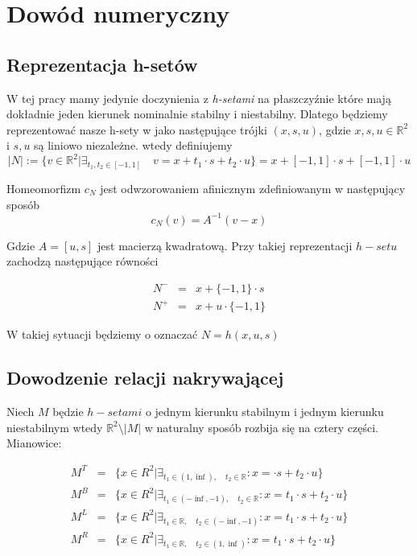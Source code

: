 
\section{Dowód numeryczny}

\subsection{Reprezentacja h-setów}

W tej pracy mamy jedynie doczynienia z {\em h-setami} na płaszczyźnie które mają dokładnie jeden kierunek 
nominalnie stabilny i niestabilny. Dlatego będziemy reprezentować nasze h-sety  w jako następujące trójki 
$ (x,s,u) $, gdzie $x,s,u \in \mathbb R^2 $ i $s,u$ są liniowo niezależne. wtedy definiujemy 
$$
  |N| := \{v \in \mathbb R^2 | \exists_{t_1,t_2 \in [-1,1]} \quad v = x + t_1 \cdot s + t_2 \cdot u  \}
      = x + [-1,1]\cdot s + [-1,1]\cdot u 
$$

Homeomorfizm $ c_N $ jest odwzorowaniem afinicznym zdefiniowanym w następujący sposób 
$$
  c_N(v) = A^{-1}(v - x) 
$$

Gdzie $ A = [u,s] $ jest macierzą kwadratową. Przy takiej reprezentacji $h-setu$ zachodzą następujące równości

\begin{eqnarray}
  N^- & = & x + \{-1,1\} \cdot s \\
  N^+ & = & x + u \cdot \{-1,1\}  
\end{eqnarray}

W takiej sytuacji będziemy o oznaczać $ N = h(x,u,s) $

\subsection{Dowodzenie relacji nakrywającej}

Niech $ M $ będzie $ h-setami$ o jednym kierunku stabilnym i jednym kierunku niestabilnym wtedy 
$ \mathbb{R}^2 \setminus |M| $ w naturalny 
sposób rozbija się na cztery części. Mianowice:

\begin{eqnarray}
  M^T & = & \{ x \in R^2 | \exists_{ t_1 \in (1,\inf), \quad t_2 \in \mathbb R} : x =  \cdot s + t_2 \cdot u  \} \\
  M^B & = & \{ x \in R^2 | \exists_{ t_1 \in (-\inf, -1), \quad t_2 \in \mathbb R} : x = t_1 \cdot s + t_2 \cdot u  \} \\
  M^L & = & \{ x \in R^2 | \exists_{ t_1 \in \mathbb R, \quad t_2 \in (-\inf,-1)} : x = t_1 \cdot s + t_2 \cdot u  \} \\
  M^R & = & \{ x \in R^2 | \exists_{ t_1 \in \mathbb R, \quad t_2 \in (1,\inf)} : x = t_1 \cdot s + t_2 \cdot u  \} \\
\end{eqnarray}


